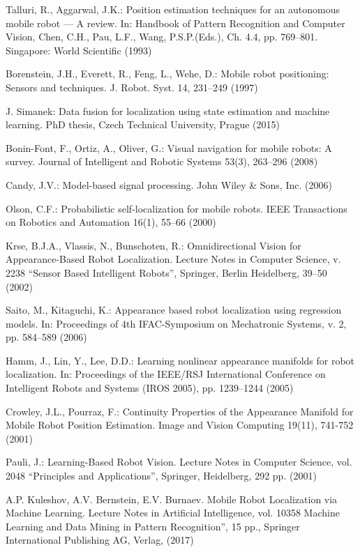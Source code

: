\documentclass[conference]{IEEEtran} %
\begin{document}
\begin{thebibliography}{100}

Talluri, R., Aggarwal, J.K.: Position estimation techniques for an autonomous mobile robot --- A review. In: Handbook of Pattern Recognition and Computer Vision, Chen, C.H., Pau, L.F., Wang, P.S.P.(Eds.), Ch. 4.4, pp. 769--801. Singapore: World Scientific (1993)

Borenstein, J.H., Everett, R., Feng, L., Wehe, D.: Mobile robot positioning: Sensors and techniques. J. Robot. Syst. 14, 231--249 (1997)

J. Simanek: Data fusion for localization using state estimation and machine learning. PhD thesis, Czech Technical University, Prague (2015)

Bonin-Font, F., Ortiz, A., Oliver, G.: Visual navigation for mobile robots: A survey. Journal of Intelligent and Robotic Systems 53(3), 263–296 (2008)

Candy, J.V.: Model-based signal processing. John Wiley \& Sons, Inc. (2006)

Olson, C.F.: Probabilistic self-localization for mobile robots. IEEE Transactions on Robotics and Automation 16(1), 55--66 (2000)

Krse, B.J.A., Vlassis, N., Bunschoten, R.: Omnidirectional Vision for Appearance-Based Robot Localization. Lecture Notes in Computer Science, v. 2238 ``Sensor Based Intelligent Robots'', Springer, Berlin Heidelberg, 39--50 (2002)

Saito, M., Kitaguchi, K.: Appearance based robot localization using regression models. In: Proceedings of 4th IFAC-Symposium on Mechatronic Systems, v. 2, pp. 584--589 (2006)

Hamm, J., Lin, Y., Lee, D.D.: Learning nonlinear appearance manifolds for robot localization. In: Proceedings of the IEEE/RSJ International Conference on Intelligent Robots and Systems (IROS 2005), pp. 1239--1244 (2005)

Crowley, J.L., Pourraz, F.: Continuity Properties of the Appearance Manifold for Mobile Robot Position Estimation. Image and Vision Computing 19(11), 741-752 (2001)

Pauli, J.: Learning-Based Robot Vision. Lecture Notes in Computer Science, vol. 2048 ``Principles and Applications'', Springer, Heidelberg, 292 pp. (2001)

A.P. Kuleshov, A.V. Bernstein, E.V. Burnaev. Mobile Robot Localization via Machine Learning. Lecture Notes in Artificial Intelligence, vol. 10358 Machine Learning and Data Mining in Pattern Recognition”, 15 pp., Springer International Publishing AG, Verlag, (2017)


\end{thebibliography}
\end{document}
